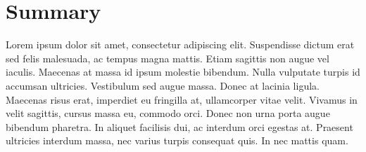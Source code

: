 \documentclass[a4paper,12pt]{article}
\begin{document}
\section{Summary}

Lorem ipsum dolor sit amet, consectetur adipiscing elit. Suspendisse dictum erat sed felis malesuada, ac tempus magna mattis. Etiam sagittis non augue vel iaculis. Maecenas at massa id ipsum molestie bibendum. Nulla vulputate turpis id accumsan ultricies. Vestibulum sed augue massa. Donec at lacinia ligula. Maecenas risus erat, imperdiet eu fringilla at, ullamcorper vitae velit. Vivamus in velit sagittis, cursus massa eu, commodo orci. Donec non urna porta augue bibendum pharetra. In aliquet facilisis dui, ac interdum orci egestas at. Praesent ultricies interdum massa, nec varius turpis consequat quis. In nec mattis quam.


\newpage



\end{document}
